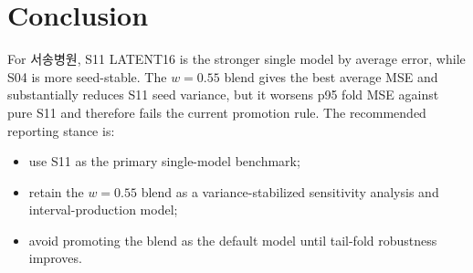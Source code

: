 \documentclass[11pt]{article}
\begin{document}
\section{Conclusion}

For 서송병원, S11 LATENT16 is the stronger single model by average error,
while S04 is more seed-stable. The $w=0.55$ blend gives the best average
MSE and substantially reduces S11 seed variance, but it worsens p95 fold
MSE against pure S11 and therefore fails the current promotion rule. The
recommended reporting stance is:
\begin{itemize}
  \item use S11 as the primary single-model benchmark;
  \item retain the $w=0.55$ blend as a variance-stabilized sensitivity
  analysis and interval-production model;
  \item avoid promoting the blend as the default model until tail-fold
  robustness improves.
\end{itemize}
\end{document}
